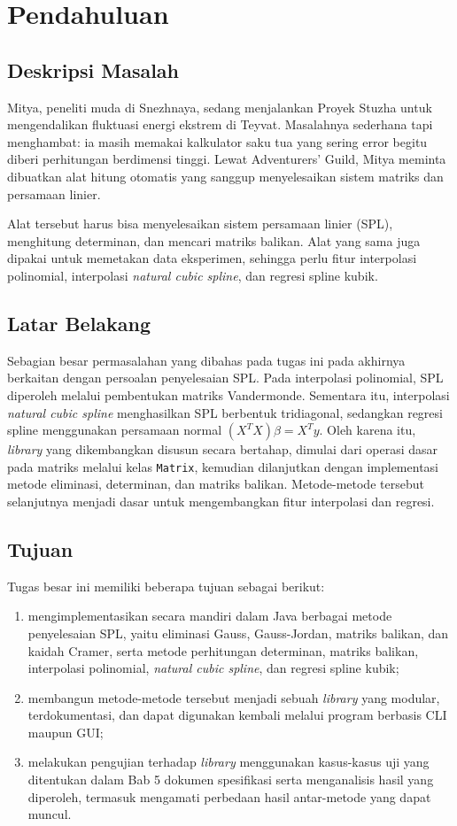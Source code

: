 \section{Pendahuluan}

\subsection{Deskripsi Masalah}

Mitya, peneliti muda di Snezhnaya, sedang menjalankan Proyek Stuzha untuk mengendalikan fluktuasi energi ekstrem di Teyvat. Masalahnya sederhana tapi menghambat: ia masih memakai kalkulator saku tua yang sering error begitu diberi perhitungan berdimensi tinggi. Lewat Adventurers' Guild, Mitya meminta dibuatkan alat hitung otomatis yang sanggup menyelesaikan sistem matriks dan persamaan linier.

Alat tersebut harus bisa menyelesaikan sistem persamaan linier (SPL), menghitung determinan, dan mencari matriks balikan. Alat yang sama juga dipakai untuk memetakan data eksperimen, sehingga perlu fitur interpolasi polinomial, interpolasi \textit{natural cubic spline}, dan regresi spline kubik.
\subsection{Latar Belakang}

Sebagian besar permasalahan yang dibahas pada tugas ini pada akhirnya berkaitan dengan persoalan penyelesaian SPL. Pada interpolasi polinomial, SPL diperoleh melalui pembentukan matriks Vandermonde. Sementara itu, interpolasi \textit{natural cubic spline} menghasilkan SPL berbentuk tridiagonal, sedangkan regresi spline menggunakan persamaan normal $(X^TX)\beta = X^Ty$. Oleh karena itu, \textit{library} yang dikembangkan disusun secara bertahap, dimulai dari operasi dasar pada matriks melalui kelas \texttt{Matrix}, kemudian dilanjutkan dengan implementasi metode eliminasi, determinan, dan matriks balikan. Metode-metode tersebut selanjutnya menjadi dasar untuk mengembangkan fitur interpolasi dan regresi.

\subsection{Tujuan}

Tugas besar ini memiliki beberapa tujuan sebagai berikut:
\begin{enumerate}[nosep]
\item mengimplementasikan secara mandiri dalam Java berbagai metode penyelesaian SPL, yaitu eliminasi Gauss, Gauss-Jordan, matriks balikan, dan kaidah Cramer, serta metode perhitungan determinan, matriks balikan, interpolasi polinomial, \textit{natural cubic spline}, dan regresi spline kubik;
\item membangun metode-metode tersebut menjadi sebuah \textit{library} yang modular, terdokumentasi, dan dapat digunakan kembali melalui program berbasis CLI maupun GUI;
\item melakukan pengujian terhadap \textit{library} menggunakan kasus-kasus uji yang ditentukan dalam Bab 5 dokumen spesifikasi serta menganalisis hasil yang diperoleh, termasuk mengamati perbedaan hasil antar-metode yang dapat muncul.
\end{enumerate}

